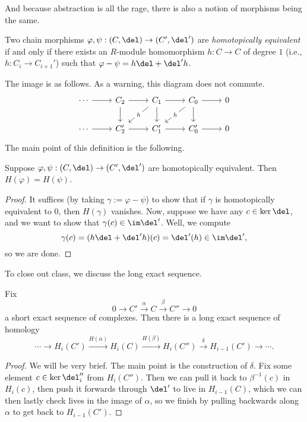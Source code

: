 And because abstraction is all the rage, there is also a notion of morphisms being the same.
\begin{definition}
	Two chain morphisms $\varphi,\psi:(C,\del)\to(C',\del')$ are \textit{homotopically equivalent} if and only if there exists an $R$-module homomorphism $h:C\to C$ of degree $1$ (i.e., $h:C_i\to C_{i+1}'$) such that $\varphi-\psi=h\del+\del'h$.
\end{definition}
The image is as follows. As a warning, this diagram does not commute.
\[\begin{tikzcd}
	\cdots & {C_2} & {C_1} & {C_0} & 0 \\
	\cdots & {C_2'} & {C_1'} & {C_0'} & 0
	\arrow[from=1-1, to=1-2]
	\arrow[from=1-2, to=1-3]
	\arrow[from=1-3, to=1-4]
	\arrow[from=1-4, to=1-5]
	\arrow[from=2-1, to=2-2]
	\arrow[from=2-2, to=2-3]
	\arrow[from=2-3, to=2-4]
	\arrow[from=2-4, to=2-5]
	\arrow[from=1-4, to=2-4]
	\arrow[from=1-3, to=2-3]
	\arrow[from=1-2, to=2-2]
	\arrow["h"{description}, from=1-4, to=2-3]
	\arrow["h"{description}, from=1-3, to=2-2]
\end{tikzcd}\]
The main point of this definition is the following.
\begin{proposition}
	Suppose $\varphi,\psi:(C,\del)\to(C',\del')$ are homotopically equivalent. Then $H(\varphi)=H(\psi)$.
\end{proposition}
\begin{proof}
	It suffices (by taking $\gamma:=\varphi-\psi$) to show that if $\gamma$ is homotopically equivalent to $0$, then $H(\gamma)$ vanishes. Now, suppose we have any $c\in\ker\del$, and we want to show that $\gamma(c)\in\im\del'$. Well, we compute
	\[\gamma(c)=(h\del+\del'h)(c)=\del'(h)\in\im\del',\]
	so we are done.
\end{proof}

To close out class, we discuss the long exact sequence.
\begin{theorem}
	Fix
	\[0\to C'\stackrel\alpha\to C\stackrel\beta\to C''\to0\]
	a short exact sequence of complexes. Then there is a long exact sequence of homology
	\[\cdots\to H_i(C')\stackrel{H(\alpha)}\to H_i(C)\stackrel{H(\beta)}\to H_i(C'')\stackrel{\delta}\to H_{i-1}(C')\to\cdots.\]
\end{theorem}
\begin{proof}
	We will be very brief. The main point is the construction of $\delta$. Fix some element $c\in\ker\del_i''$ from $H_i(C'')$. Then we can pull it back to $\beta^{-1}(c)$ in $H_i(c)$, then push it forwards through $\del'$ to live in $H_{i-1}(C)$, which we can then lastly check lives in the image of $\alpha$, so we finish by pulling backwards along $\alpha$ to get back to $H_{i-1}(C')$.
\end{proof}